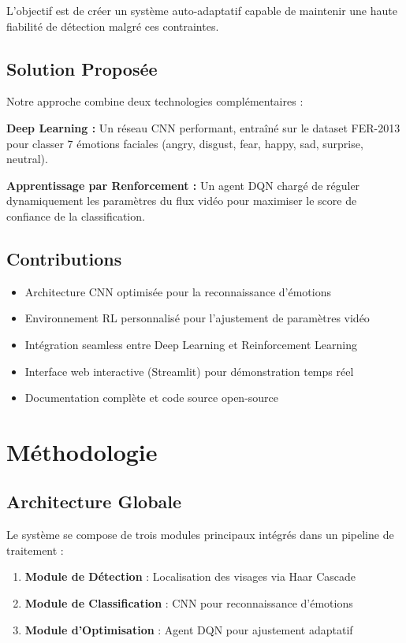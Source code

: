 \documentclass[12pt,a4paper]{article}
\begin{document}
L'objectif est de créer un système auto-adaptatif capable de maintenir une haute fiabilité de détection malgré ces contraintes.

\subsection{Solution Proposée}
Notre approche combine deux technologies complémentaires :

\textbf{Deep Learning :} Un réseau CNN performant, entraîné sur le dataset FER-2013 pour classer 7 émotions faciales (angry, disgust, fear, happy, sad, surprise, neutral).

\textbf{Apprentissage par Renforcement :} Un agent DQN chargé de réguler dynamiquement les paramètres du flux vidéo pour maximiser le score de confiance de la classification.

\subsection{Contributions}
\begin{itemize}
    \item Architecture CNN optimisée pour la reconnaissance d'émotions
    \item Environnement RL personnalisé pour l'ajustement de paramètres vidéo
    \item Intégration seamless entre Deep Learning et Reinforcement Learning
    \item Interface web interactive (Streamlit) pour démonstration temps réel
    \item Documentation complète et code source open-source
\end{itemize}

\newpage

\section{Méthodologie}

\subsection{Architecture Globale}

Le système se compose de trois modules principaux intégrés dans un pipeline de traitement :

\begin{enumerate}
    \item \textbf{Module de Détection} : Localisation des visages via Haar Cascade
    \item \textbf{Module de Classification} : CNN pour reconnaissance d'émotions
    \item \textbf{Module d'Optimisation} : Agent DQN pour ajustement adaptatif
\end{enumerate}
\end{document}
